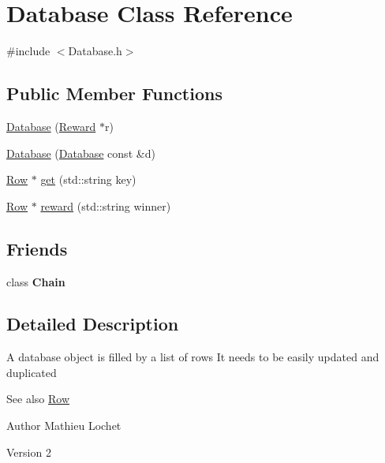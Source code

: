 \hypertarget{classDatabase}{}\section{Database Class Reference}
\label{classDatabase}


{\ttfamily \#include $<$Database.\+h$>$}

\subsection*{Public Member Functions}
\begin{DoxyCompactItemize}
\item 
\mbox{\hyperlink{classDatabase_ab00a6ec54927a6a80f5c09a926ee4611}{Database}} (\mbox{\hyperlink{classReward}{Reward}} $\ast$r)
\item 
\mbox{\hyperlink{classDatabase_ab366035be8ad9836454da24f4a5e27ed}{Database}} (\mbox{\hyperlink{classDatabase}{Database}} const \&d)
\item 
\mbox{\hyperlink{classRow}{Row}} $\ast$ \mbox{\hyperlink{classDatabase_a748f2ce7df893cdb61d8418be907ac72}{get}} (std\+::string key)
\item 
\mbox{\hyperlink{classRow}{Row}} $\ast$ \mbox{\hyperlink{classDatabase_a5bdce9dce60e4fdb4f04c7baa023c0b8}{reward}} (std\+::string winner)
\end{DoxyCompactItemize}
\subsection*{Friends}
\begin{DoxyCompactItemize}
\item 
\mbox{\label{classDatabase_a65813570c30a3e0656fa523793ff1b86}} 
class {\bfseries Chain}
\end{DoxyCompactItemize}


\subsection{Detailed Description}
A database object is filled by a list of rows It needs to be easily updated and duplicated \begin{DoxySeeAlso}{See also}
\mbox{\hyperlink{classRow}{Row}}
\end{DoxySeeAlso}
\begin{DoxyAuthor}{Author}
Mathieu Lochet 
\end{DoxyAuthor}
\begin{DoxyVersion}{Version}
2 
\end{DoxyVersion}


